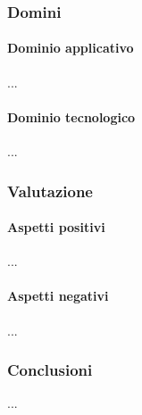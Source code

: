 \documentclass[italian,12pt]{article} %
\begin{document}
\subsubsection{Domini}
\paragraph{Dominio applicativo}
...
\paragraph{Dominio tecnologico}
...

\subsubsection{Valutazione}
\paragraph{Aspetti positivi}
...
\paragraph{Aspetti negativi}
...

\subsubsection{Conclusioni}
...
\end{document}
